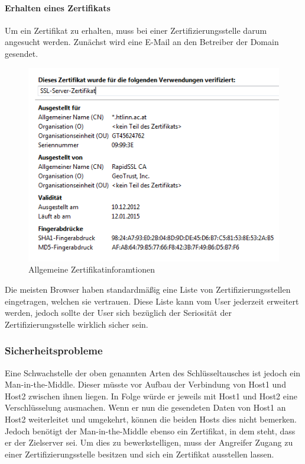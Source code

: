 \paragraph{Erhalten eines Zertifikats}
Um ein Zertifikat zu erhalten, muss bei einer Zertifizierungsstelle darum angesucht werden. Zunächst wird eine E-Mail an den Betreiber der Domain gesendet.
\begin{figure}[H]
\centering
\includegraphics[keepaspectratio=true, width=12cm]{images/screenshots/certificate.png}
\caption{Allgemeine Zertifikatinforamtionen}
\label{fig:certificate}
\end{figure}
Die meisten Browser haben standardmäßig eine Liste von Zertifizierungsstellen eingetragen, welchen sie vertrauen. Diese Liste kann vom User jederzeit erweitert werden, jedoch sollte der User sich bezüglich der Seriosität der Zertifizierungsstelle wirklich sicher sein. 

\subsubsection{Sicherheitsprobleme}
Eine Schwachstelle der oben genannten Arten des Schlüsseltausches ist jedoch ein Man-in-the-Middle. Dieser müsste vor Aufbau der Verbindung von Host1 und Host2 zwischen ihnen liegen. In Folge würde er jeweils mit Host1 und Host2 eine Verschlüsselung ausmachen. Wenn er nun die gesendeten Daten von Host1 an Host2 weiterleitet und umgekehrt, können die beiden Hosts dies nicht bemerken.\\
Jedoch benötigt der Man-in-the-Middle ebenso ein Zertifikat, in dem steht, dass er der Zielserver sei. Um dies zu bewerkstelligen, muss der Angreifer Zugang zu einer Zertifizierungsstelle besitzen und sich ein Zertifikat ausstellen lassen.